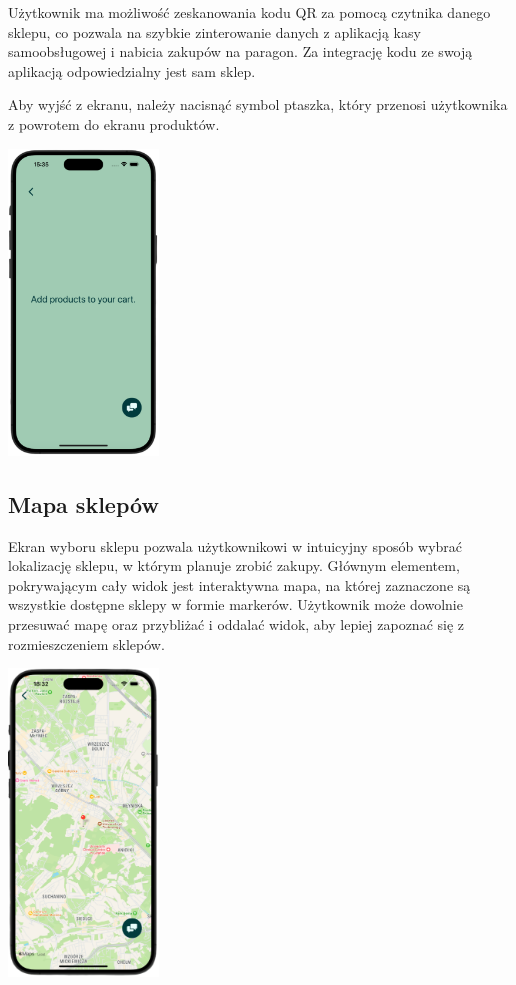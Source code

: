 Użytkownik ma możliwość zeskanowania kodu QR za pomocą czytnika danego sklepu, co pozwala na szybkie zinterowanie danych z aplikacją kasy samoobsługowej i nabicia zakupów na paragon. Za integrację kodu ze swoją aplikacją odpowiedzialny jest sam sklep. 

Aby wyjść z ekranu, należy nacisnąć symbol ptaszka, który przenosi użytkownika z powrotem do ekranu produktów.

\begin{center}
    \includegraphics[width=0.3\textwidth]{images/front/qr_empty.png}
\end{center}

\subsection{Mapa sklepów}

Ekran wyboru sklepu pozwala użytkownikowi w intuicyjny sposób wybrać lokalizację sklepu, w którym planuje zrobić zakupy. Głównym elementem, pokrywającym cały widok jest interaktywna mapa, na której zaznaczone są wszystkie dostępne sklepy w formie markerów. Użytkownik może dowolnie przesuwać mapę oraz przybliżać i oddalać widok, aby lepiej zapoznać się z rozmieszczeniem sklepów. 

\begin{center}
\includegraphics[width=0.3\textwidth]{images/front/store_page.png}
\end{center}

